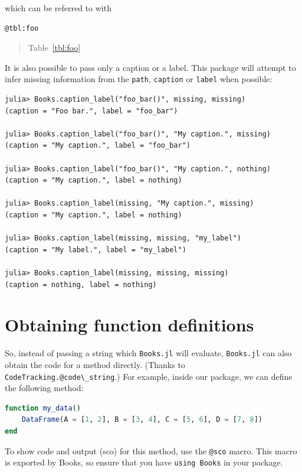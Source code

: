 \documentclass[
  notoc %
]{tufte-book}
\newcommand{\passthrough}[1]{#1}
\begin{document}
which can be referred to with

\begin{lstlisting}
@tbl:foo
\end{lstlisting}

\begin{quote}
Table~\ref{tbl:foo}
\end{quote}

It is also possible to pass only a caption or a label. This package will
attempt to infer missing information from the
\passthrough{\lstinline!path!}, \passthrough{\lstinline!caption!} or
\passthrough{\lstinline!label!} when possible:

\begin{lstlisting}[language=Output]
julia> Books.caption_label("foo_bar()", missing, missing)
(caption = "Foo bar.", label = "foo_bar")

julia> Books.caption_label("foo_bar()", "My caption.", missing)
(caption = "My caption.", label = "foo_bar")

julia> Books.caption_label("foo_bar()", "My caption.", nothing)
(caption = "My caption.", label = nothing)

julia> Books.caption_label(missing, "My caption.", missing)
(caption = "My caption.", label = nothing)

julia> Books.caption_label(missing, missing, "my_label")
(caption = "My label.", label = "my_label")

julia> Books.caption_label(missing, missing, missing)
(caption = nothing, label = nothing)
\end{lstlisting}

\hypertarget{sec:function_code_blocks}{%
\section{Obtaining function
definitions}\label{sec:function_code_blocks}}

So, instead of passing a string which \passthrough{\lstinline!Books.jl!}
will evaluate, \passthrough{\lstinline!Books.jl!} can also obtain the
code for a method directly. (Thanks to
\passthrough{\lstinline!CodeTracking.@code\_string!}.) For example,
inside our package, we can define the following method:

\begin{lstlisting}[language=Julia]
function my_data()
    DataFrame(A = [1, 2], B = [3, 4], C = [5, 6], D = [7, 8])
end
\end{lstlisting}

To show code and output (sco) for this method, use the
\passthrough{\lstinline!@sco!} macro. This macro is exported by Books,
so ensure that you have \passthrough{\lstinline!using Books!} in your
package.
\end{document}
